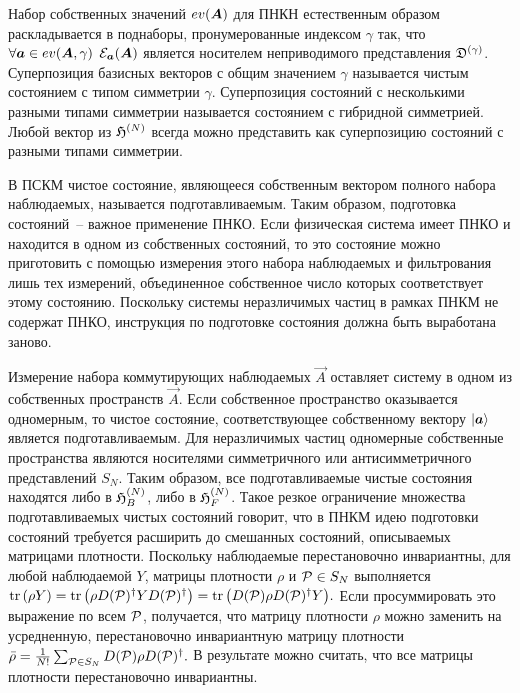 \documentclass[a4paper, 12pt]{article}
\begin{document}
Набор собственных значений ${}{{ev}\!\left({\boldsymbol{A}}{}\right)}$ для ПНКН естественным образом 
раскладывается в поднаборы, пронумерованные индексом $\gamma$ так, что 
$\forall {\boldsymbol{a}}{} \in {}{{ev}\!\left({\boldsymbol{A}}{}, \gamma\right)}$ ${\mathcal{E}}_{\boldsymbol{a}}{}({\boldsymbol{A}}{})$ 
является носителем неприводимого представления ${\mathfrak{D}^{(\gamma)}}{}$.
%
Суперпозиция базисных векторов с общим значением $\gamma$ называется 
чистым состоянием с типом симметрии $\gamma$. Суперпозиция состояний 
с несколькими разными типами симметрии называется состоянием с гибридной 
симметрией. Любой вектор из $\mathfrak{H}^{(N)}$ всегда можно представить как 
суперпозицию состояний с разными типами симметрии.


\label{sec:paper:4.2}

В ПСКМ чистое состояние, являющееся собственным вектором полного набора 
наблюдаемых, называется подготавливаемым. Таким образом, подготовка 
состояний~-- важное применение ПНКО. Если физическая система имеет ПНКО 
и находится в одном из собственных состояний, то это состояние можно 
приготовить с помощью измерения этого набора наблюдаемых и фильтрования 
лишь тех измерений, объединенное собственное число которых соответствует 
этому состоянию. Поскольку системы неразличимых частиц в рамках ПНКМ не 
содержат ПНКО, инструкция по подготовке состояния должна быть выработана 
заново.

Измерение набора коммутирующих наблюдаемых $\vec{A}$ оставляет систему 
в одном из собственных пространств $\vec{A}$. Если собственное 
пространство оказывается одномерным, то чистое состояние, 
соответствующее собственному вектору ${\left|{\boldsymbol{a}}{}\right\rangle}$ является 
подготавливаемым. Для неразличимых частиц одномерные собственные 
пространства являются носителями симметричного или антисимметричного 
представлений $S_N$. Таким образом, все подготавливаемые чистые 
состояния находятся либо в $\mathfrak{H}^{(N)}_B$, либо в $\mathfrak{H}^{(N)}_F$. Такое резкое 
ограничение множества подготавливаемых чистых состояний говорит, что 
в ПНКМ идею подготовки состояний требуется расширить до смешанных 
состояний, описываемых матрицами плотности. Поскольку наблюдаемые 
перестановочно инвариантны, для любой наблюдаемой $Y$, матрицы плотности 
$\rho$ и ${\mathcal{P}} \in S_N$ выполняется
${\mathrm{tr}\left(\rho Y\right)} = {\mathrm{tr}\left(\rho D({\mathcal{P}})^\dag Y D({\mathcal{P}})^\dag\right)} 
= {\mathrm{tr}\left(D({\mathcal{P}}) \rho D({\mathcal{P}})^\dag Y\right)}.$
Если просуммировать это выражение по всем ${\mathcal{P}}$, получается, что 
матрицу плотности $\rho$ можно заменить на усредненную, перестановочно 
инвариантную матрицу плотности
${\bar{\rho}}{} = \frac{1}{N!}\sum_{{\mathcal{P}} \in S_N}D({\mathcal{P}})\rho D({\mathcal{P}})^\dag.$
В результате можно считать, что все матрицы плотности перестановочно 
инвариантны.
\end{document}
